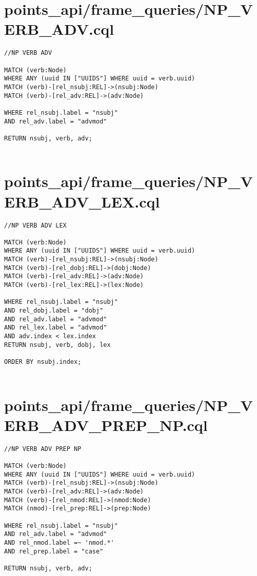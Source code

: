 \documentclass{article}
\begin{document}
\section*{points\_api/frame\_queries/NP\_VERB\_ADV.cql}
\begin{verbatim}
//NP VERB ADV

MATCH (verb:Node)
WHERE ANY (uuid IN ["UUIDS"] WHERE uuid = verb.uuid)
MATCH (verb)-[rel_nsubj:REL]->(nsubj:Node)
MATCH (verb)-[rel_adv:REL]->(adv:Node)

WHERE rel_nsubj.label = "nsubj"
AND rel_adv.label = "advmod"

RETURN nsubj, verb, adv;


\end{verbatim}
\pagebreak

\section*{points\_api/frame\_queries/NP\_VERB\_ADV\_LEX.cql}
\begin{verbatim}
//NP VERB ADV LEX

MATCH (verb:Node)
WHERE ANY (uuid IN ["UUIDS"] WHERE uuid = verb.uuid)
MATCH (verb)-[rel_nsubj:REL]->(nsubj:Node)
MATCH (verb)-[rel_dobj:REL]->(dobj:Node)
MATCH (verb)-[rel_adv:REL]->(adv:Node)
MATCH (verb)-[rel_lex:REL]->(lex:Node)

WHERE rel_nsubj.label = "nsubj"
AND rel_dobj.label = "dobj"
AND rel_adv.label = "advmod"
AND rel_lex.label = "advmod"
AND adv.index < lex.index
RETURN nsubj, verb, dobj, lex

ORDER BY nsubj.index;


\end{verbatim}
\pagebreak

\section*{points\_api/frame\_queries/NP\_VERB\_ADV\_PREP\_NP.cql}
\begin{verbatim}
//NP VERB ADV PREP NP

MATCH (verb:Node)
WHERE ANY (uuid IN ["UUIDS"] WHERE uuid = verb.uuid)
MATCH (verb)-[rel_nsubj:REL]->(nsubj:Node)
MATCH (verb)-[rel_adv:REL]->(adv:Node)
MATCH (verb)-[rel_nmod:REL]->(nmod:Node)
MATCH (nmod)-[rel_prep:REL]->(prep:Node)

WHERE rel_nsubj.label = "nsubj"
AND rel_adv.label = "advmod"
AND rel_nmod.label =~ 'nmod.*'
AND rel_prep.label = "case"

RETURN nsubj, verb, adv;


\end{verbatim}
\pagebreak
\end{document}

